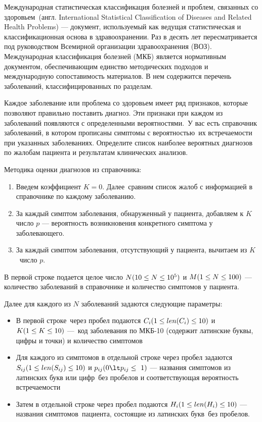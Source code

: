 
Международная статистическая классификация болезней и проблем, связанных со здоровьем (англ. International Statistical Classification of Diseases and Related Health Problems) — документ, используемый как ведущая статистическая и классификационная основа в здравоохранении. Раз в десять лет пересматривается под руководством Всемирной организации здравоохранения (ВОЗ). Международная классификация болезней (МКБ) является нормативным документом, обеспечивающим единство методических подходов и международную сопоставимость материалов. В нем содержится перечень заболеваний, классифицированных по разделам. 

Каждое заболевание или проблема со здоровьем имеет ряд признаков, которые позволяют правильно поставить диагноз. Эти признаки при каждом из заболеваний появляются с определенными вероятностями. У вас есть справочник заболеваний, в котором прописаны симптомы с вероятностью их встречаемости при указанных заболеваниях. Определите список наиболее вероятных диагнозов по жалобам пациента и результатам клинических анализов.

Методика оценки диагнозов из справочника:

\begin{enumerate}
    \item Введем коэффициент $K = 0$. Далее сравним список жалоб с информацией в справочнике по каждому заболеванию.
    \item За каждый симптом заболевания, обнаруженный у пациента, добавляем к $K$ число $p$ — вероятность возникновения конкретного симптома у заболевающего.
    \item За каждый симптом заболевания, отсутствующий у пациента, вычитаем из $K$ число $p$.
\end{enumerate}


В первой строке подается целое число $N\space (10\leq N \leq 10^5)$ и $M\space (1\leq N \leq 100) $ — количество заболеваний в справочнике и количество симптомов у пациента. 

Далее для каждого из $N$ заболеваний задаются следующие параметры:
\begin{itemize}
\item В первой строке через пробел подаются $C_i\space(1\leq len(C_i) \leq 10)$ и $K\space(1\leq K \leq 10)$ — код заболевания по МКБ-10 (содержит латинские буквы, цифры и точки) и количество симптомов 
\item Для каждого из симптомов в отдельной строке через пробел задаются $S_{ij}\space(1\leq len(S_{ij}) \leq 10)$ и $p_{ij}\space(0\lt p_{ij} \leq 1)$ — названия симптомов из латинских букв или цифр без пробелов и соответствующая вероятность встречаемости
\item Затем в отдельной строке через пробел подаются $H_{i}\space(1\leq len(H_{i}) \leq 10)$ — названия симптомов пациента, состоящие из латинских букв без пробелов.
\end{itemize}


